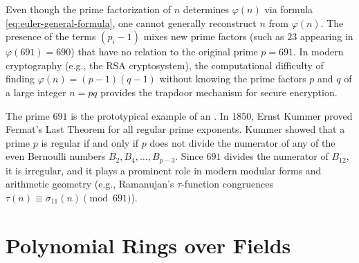 \begin{content}

\begin{steps}
Even though the prime factorization of $n$ determines $\varphi(n)$ via formula \eqref{eq:euler-general-formula}, one cannot generally reconstruct $n$ from $\varphi(n)$. The presence of the terms $(p_i - 1)$ mixes new prime factors (such as $23$ appearing in $\varphi(691) = 690$) that have no relation to the original prime $p = 691$. In modern cryptography (e.g., the RSA cryptosystem), the computational difficulty of finding $\varphi(n) = (p - 1)(q - 1)$ without knowing the prime factors $p$ and $q$ of a large integer $n = pq$ provides the trapdoor mechanism for secure encryption.
\end{steps}
\end{content}

\begin{aiNote}
The prime $691$ is the prototypical example of an . In 1850, Ernst Kummer proved Fermat's Last Theorem for all regular prime exponents. Kummer showed that a prime $p$ is regular if and only if $p$ does not divide the numerator of any of the even Bernoulli numbers $B_2, B_4, \dots, B_{p-3}$. Since $691$ divides the numerator of $B_{12}$, it is irregular, and it plays a prominent role in modern modular forms and arithmetic geometry (e.g., Ramanujan's $\tau$-function congruences $\tau(n) \equiv \sigma_{11}(n) \pmod{691}$).
\end{aiNote}

\section{Polynomial Rings over Fields}

